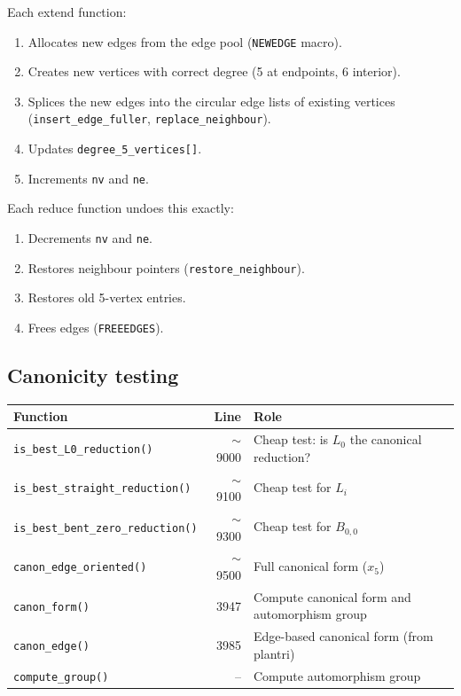 \documentclass[11pt,a4paper]{article}
\theoremstyle{definition}
\begin{document}
Each extend function:
\begin{enumerate}[nosep]
  \item Allocates new edges from the edge pool (\texttt{NEWEDGE} macro).
  \item Creates new vertices with correct degree (5 at endpoints, 6 interior).
  \item Splices the new edges into the circular edge lists of existing vertices
    (\texttt{insert\_edge\_fuller}, \texttt{replace\_neighbour}).
  \item Updates \texttt{degree\_5\_vertices[]}.
  \item Increments \texttt{nv} and \texttt{ne}.
\end{enumerate}

Each reduce function undoes this exactly:
\begin{enumerate}[nosep]
  \item Decrements \texttt{nv} and \texttt{ne}.
  \item Restores neighbour pointers (\texttt{restore\_neighbour}).
  \item Restores old 5-vertex entries.
  \item Frees edges (\texttt{FREEEDGES}).
\end{enumerate}

\subsection{Canonicity testing}

\begin{center}
\begin{tabular}{lrl}
Function & Line & Role \\
\hline
\texttt{is\_best\_L0\_reduction()} & $\sim$9000 & Cheap test: is $L_0$ the canonical reduction? \\
\texttt{is\_best\_straight\_reduction()} & $\sim$9100 & Cheap test for $L_i$ \\
\texttt{is\_best\_bent\_zero\_reduction()} & $\sim$9300 & Cheap test for $B_{0,0}$ \\
\texttt{canon\_edge\_oriented()} & $\sim$9500 & Full canonical form ($x_5$) \\
\texttt{canon\_form()} & 3947 & Compute canonical form and automorphism group \\
\texttt{canon\_edge()} & 3985 & Edge-based canonical form (from plantri) \\
\texttt{compute\_group()} & -- & Compute automorphism group \\
\end{tabular}
\end{center}
\end{document}
